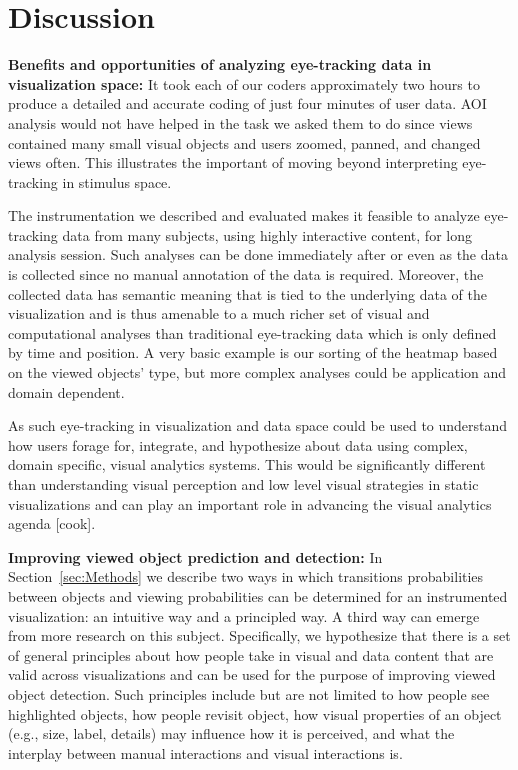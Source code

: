 \section{Discussion}

\textbf{Benefits and opportunities of analyzing eye-tracking data in visualization space:} It took each of our coders approximately two hours to produce a detailed and accurate coding of just four minutes of user data. AOI analysis would not have helped in the task we asked them to do since views contained many small visual objects and users zoomed, panned, and changed views often. This illustrates the important of moving beyond interpreting eye-tracking in stimulus space.

The instrumentation we described and evaluated makes it feasible to analyze eye-tracking data from many subjects, using highly interactive content, for long analysis session. Such analyses can be done immediately after or even as the data is collected since no manual annotation of the data is required. Moreover, the collected data has semantic meaning that is tied to the underlying data of the visualization and is thus amenable to a much richer set of visual and computational analyses than traditional eye-tracking data which is only defined by time and position. A very basic example is our sorting of the heatmap based on the viewed objects' type, but more complex analyses could be application and domain dependent.

As such eye-tracking in visualization and data space could be used to understand how users forage for, integrate, and hypothesize about data using complex, domain specific, visual analytics systems. This would be significantly different than understanding visual perception and low level visual strategies in static visualizations and can play an important role in advancing the visual analytics agenda [cook]. 

\textbf{Improving viewed object prediction and detection:} In Section~\ref{sec:Methods} we describe two ways in which transitions probabilities between objects and viewing probabilities can be determined for an instrumented visualization: an intuitive way and a principled way. A third way can emerge from more research on this subject. Specifically, we hypothesize that there is a set of general principles about how people take in visual and data content that are valid across visualizations and can be used for the purpose of improving viewed object detection. Such principles include but are not limited to how people see highlighted objects, how people revisit object, how visual properties of an object (e.g., size, label, details) may influence how it is perceived, and what the interplay between manual interactions and visual interactions is.

